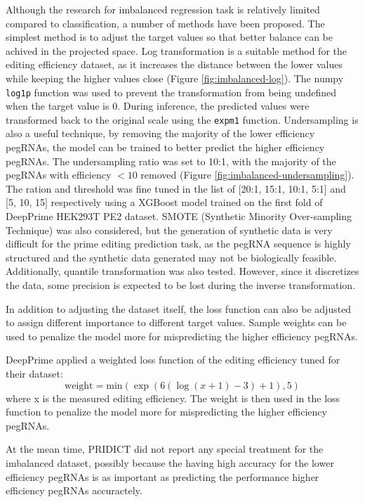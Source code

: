 Although the research for imbalanced regression task is relatively limited compared to classification, a number of methods have been proposed\cite{krawczykLearningImbalancedData2016}. The simplest method is to adjust the target values so that better balance can be achived in the projected space. Log transformation is a suitable method for the editing efficiency dataset, as it increases the distance between the lower values while keeping the higher values close (Figure \ref{fig:imbalanced-log}). The numpy \verb|log1p| function was used to prevent the transformation from being undefined when the target value is 0. During inference, the predicted values were transformed back to the original scale using the \verb|expm1| function. Undersampling is also a useful technique, by removing the majority of the lower efficiency pegRNAs, the model can be trained to better predict the higher efficiency pegRNAs\cite{torgoResamplingStrategiesRegression2015}. 
The undersampling ratio was set to 10:1, with the majority of the pegRNAs with efficiency $<10$ removed (Figure \ref{fig:imbalanced-undersampling}). The ration and threshold was fine tuned in the list of [20:1, 15:1, 10:1, 5:1] and [5, 10, 15] respectively using a XGBoost model trained on the first fold of DeepPrime HEK293T PE2 dataset. 
SMOTE (Synthetic Minority Over-sampling Technique) was also considered, but the generation of synthetic data is very difficult for the prime editing prediction task, as the pegRNA sequence is highly structured and the synthetic data generated may not be biologically feasible. Additionally, quantile transformation was also tested. However, since it discretizes the data, some precision is expected to be lost during the inverse transformation.

In addition to adjusting the dataset itself, the loss function can also be adjusted to assign different importance to different target values. Sample weights can be used to penalize the model more for mispredicting the higher efficiency pegRNAs. 


DeepPrime applied a weighted loss function of the editing efficiency tuned for their dataset:
\begin{equation}
    \text{weight} = \text{min}(\exp(6(\log(x+1)-3)+1),5)
\end{equation}
where x is the measured editing efficiency. The weight is then used in the loss function to penalize the model more for mispredicting the higher efficiency pegRNAs.

At the mean time, PRIDICT did not report any special treatment for the imbalanced dataset, possibly because the having high accuracy for the lower efficiency pegRNAs is as important as predicting the performance higher efficiency pegRNAs accuractely. 


